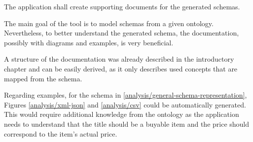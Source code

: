 \begin{requirement}
    The application shall create supporting documents for the generated schemas.
\end{requirement}

The main goal of the tool is to model schemas from a given ontology. Nevertheless, to better understand the generated schema, the documentation, possibly with diagrams and examples, is very beneficial.

A structure of the documentation was already described in the introductory chapter and can be easily derived, as it only describes used concepts that are mapped from the schema.

Regarding examples, for the schema in \autoref{analysis/general-schema-representation}, Figures \ref{analysis/xml-json} and \ref{analysis/csv} could be automatically generated. This would require additional knowledge from the ontology as the application needs to understand that the title should be a buyable item and the price should correspond to the item's actual price.